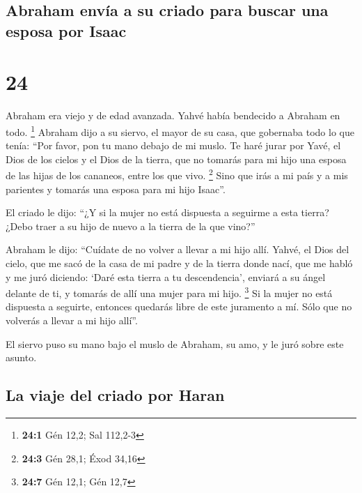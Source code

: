 \hypertarget{abraham-envuxeda-a-su-criado-para-buscar-una-esposa-por-isaac}{%
\subsection{Abraham envía a su criado para buscar una esposa por
Isaac}\label{abraham-envuxeda-a-su-criado-para-buscar-una-esposa-por-isaac}}

\hypertarget{section-23}{%
\section{24}\label{section-23}}

 Abraham era viejo y de edad avanzada. Yahvé había
bendecido a Abraham en todo. \footnote{\textbf{24:1} Gén 12,2; Sal
  112,2-3}  Abraham dijo a su siervo, el mayor de su casa,
que gobernaba todo lo que tenía: ``Por favor, pon tu mano debajo de mi
muslo.  Te haré jurar por Yavé, el Dios de los cielos y el
Dios de la tierra, que no tomarás para mi hijo una esposa de las hijas
de los cananeos, entre los que vivo. \footnote{\textbf{24:3} Gén 28,1;
  Éxod 34,16}  Sino que irás a mi país y a mis parientes y
tomarás una esposa para mi hijo Isaac''.

 El criado le dijo: ``¿Y si la mujer no está dispuesta a
seguirme a esta tierra? ¿Debo traer a su hijo de nuevo a la tierra de la
que vino?''

 Abraham le dijo: ``Cuídate de no volver a llevar a mi
hijo allí.  Yahvé, el Dios del cielo, que me sacó de la
casa de mi padre y de la tierra donde nací, que me habló y me juró
diciendo: `Daré esta tierra a tu descendencia', enviará a su ángel
delante de ti, y tomarás de allí una mujer para mi hijo. \footnote{\textbf{24:7}
  Gén 12,1; Gén 12,7}  Si la mujer no está dispuesta a
seguirte, entonces quedarás libre de este juramento a mí. Sólo que no
volverás a llevar a mi hijo allí''.

 El siervo puso su mano bajo el muslo de Abraham, su amo,
y le juró sobre este asunto.

\hypertarget{la-viaje-del-criado-por-haran}{%
\subsection{La viaje del criado por
Haran}\label{la-viaje-del-criado-por-haran}}

